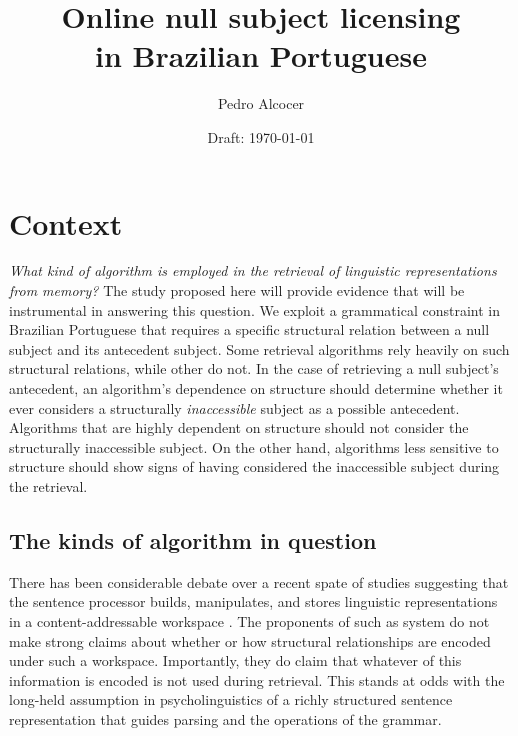 \documentclass[12pt,letterpaper]{article}
\title{Online null subject licensing\\ in Brazilian Portuguese}
\author{Pedro Alcocer}
\date{Draft: \today}
\begin{document}
\maketitle

\section{Context}

\noindent \emph{What kind of algorithm is employed in the retrieval of linguistic representations from memory?} The study proposed here will provide evidence that will be instrumental in answering this question. We exploit a grammatical constraint in Brazilian Portuguese that requires a specific structural relation between a null subject and its antecedent subject. Some retrieval algorithms rely heavily on such structural relations, while other do not. In the case of retrieving a null subject's antecedent, an algorithm's dependence on structure should determine whether it ever considers a structurally \emph{inaccessible} subject as a possible antecedent. Algorithms that are highly dependent on structure should not consider the structurally inaccessible subject. On the other hand, algorithms less sensitive to structure should show signs of having considered the inaccessible subject during the retrieval.

\subsection{The kinds of algorithm in question}

There has been considerable debate over a recent spate of studies suggesting that the sentence processor builds, manipulates, and stores linguistic representations in a content-addressable workspace \citep{mcelree00, mcelree03, lewis05, lewis06}. The proponents of such as system do not make strong claims about whether or how structural relationships are encoded under such a workspace. Importantly, they do claim that whatever of this information is encoded is not used during retrieval. This stands at odds with the long-held assumption in psycholinguistics of a richly structured sentence representation that guides parsing and the operations of the grammar.



\end{document}
